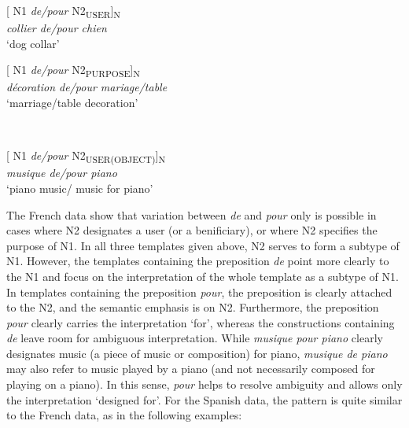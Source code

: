 \documentclass[output=paper]{langsci/langscibook}
\begin{document}
\begin{minipage}{0.4\textwidth}    %
[ N1 \textit{de/pour} N2\textsubscript{USER}]\textsubscript{N}\\
\textit{collier de/pour chien}\\
`dog collar'
\end{minipage}
\hfill            %
\begin{minipage}{0.4\textwidth}
[ N1 \textit{de/pour} N2\textsubscript{PURPOSE}]\textsubscript{N}\\
\textit{décoration de/pour mariage/table}\\
`marriage/table decoration'
\end{minipage} \\
\hfill  
\vspace{0.5cm}

\begin{minipage}{0.4\textwidth}    %
[ N1 \textit{de/pour} N2\textsubscript{USER(OBJECT)}]\textsubscript{N}\\
\textit{musique de/pour piano}\\
`piano music/ music for piano'
\end{minipage}
\hfill  
\vspace{0.5cm}      

The French data show that variation between \textit{de} and \textit{pour} only is possible in cases where N2 designates a user (or a benificiary), or where N2 specifies the purpose of N1. In all three templates given above, N2 serves to form a subtype of N1. However, the templates containing the preposition \textit{de} point more clearly to the N1 and focus on the interpretation of the whole template as a subtype of N1. In templates containing the preposition \textit{pour}, the preposition is clearly attached to the N2, and the semantic emphasis is on N2. Furthermore, the preposition \textit{pour} clearly carries the interpretation `for', whereas the constructions containing \textit{de} leave room for ambiguous interpretation. While \textit{musique pour piano} clearly designates music (a piece of music or composition) for piano, \textit{musique de piano} may also refer to music played by a piano (and not necessarily composed for playing on a piano). In this sense, \textit{pour} helps to resolve ambiguity and allows only the interpretation `designed for'. For the Spanish data, the pattern is quite similar to the French data, as in the following examples: \\
 
\end{document}
